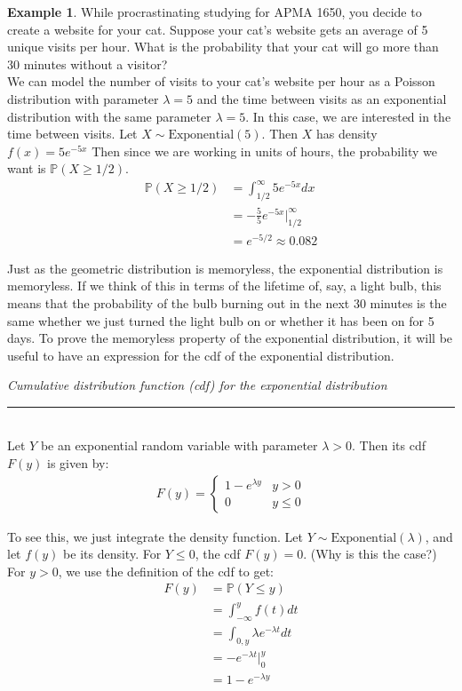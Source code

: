 \documentclass[12pt]{article}
\theoremstyle{definition}
\newtheorem*{example}{Example}
\theoremstyle{remark}
\def\P{{\mathbb P}}
\begin{document}
\begin{example}While procrastinating studying for APMA 1650, you decide to create a website for your cat. Suppose your cat's website gets an average of 5 unique visits per hour. What is the probability that your cat will go more than 30 minutes without a visitor?\\

We can model the number of visits to your cat's website per hour as a Poisson distribution with parameter $\lambda = 5$ and the time between visits as an exponential distribution with the same parameter $\lambda = 5$. In this case, we are interested in the time between visits. Let $X \sim \text{Exponential}(5)$. Then $X$ has density $f(x) = 5 e^{-5x}$
Then since we are working in units of hours, the probability we want is $\P(X \geq 1/2)$.
\begin{align*}
\P(X \geq 1/2) &= \int_{1/2}^{\infty} 5 e^{-5x} dx \\
&= -\frac{5}{5} e^{-5x}\Bigr|_{1/2}^\infty \\
&= e^{-5/2} \approx 0.082
\end{align*}
\end{example}

Just as the geometric distribution is memoryless, the exponential distribution is memoryless. If we think of this in terms of the lifetime of, say, a light bulb, this means that the probability of the bulb burning out in the next 30 minutes is the same whether we just turned the light bulb on or whether it has been on for 5 days. To prove the memoryless property of the exponential distribution, it will be useful to have an expression for the cdf of the exponential distribution.

\begin{framed}
\emph{Cumulative distribution function (cdf) for the exponential distribution}\\
  \rule{\dimexpr{}\fboxrule}{.1pt} \\
Let $Y$ be an exponential random variable with parameter $\lambda > 0$. Then its cdf $F(y)$ is given by:
\begin{align*}
F(y) = \begin{cases}
1 - e^{\lambda y} & y > 0 \\
0 & y \leq 0
\end{cases}
\end{align*}
\end{framed}
To see this, we just integrate the density function. Let $Y \sim\text{Exponential}(\lambda)$, and let $f(y)$ be its density. For $Y \leq 0$, the cdf $F(y) = 0$. (Why is this the case?) For $y > 0$, we use the definition of the cdf to get:
\begin{align*}
F(y) &= \P(Y \leq y) \\
&= \int_{-\infty}^y f(t) dt \\
&= \int_{0, y} \lambda e^{-\lambda t} dt \\
&= -e^{-\lambda t}\Bigr|_0^y \\
&= 1 - e^{-\lambda y}
\end{align*}
\end{document}
